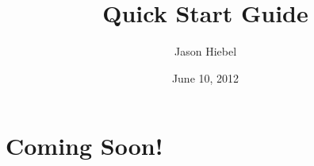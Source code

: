 \documentclass{article}
\title  { Quick Start Guide }
\author { Jason Hiebel }
\date   { June 10, 2012 }
\begin{document}
\maketitle



\section{Coming Soon!}
\end{document}
